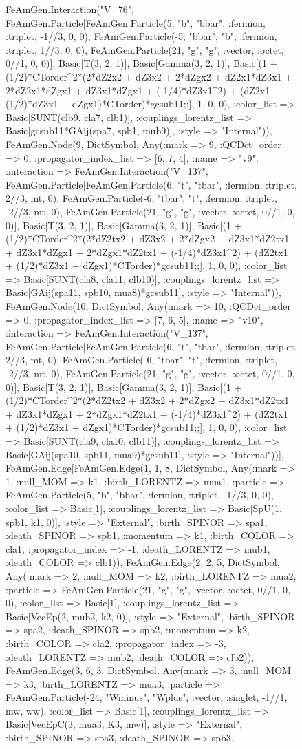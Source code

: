 \documentclass{revtex4}
\begin{document}
\begin{figure}[!htb]
\begin{center}
{FeAmGen.Interaction("V_76", FeAmGen.Particle[FeAmGen.Particle(5, "b", "bbar", :fermion, :triplet, -1//3, 0, 0), FeAmGen.Particle(-5, "bbar", "b", :fermion, :triplet, 1//3, 0, 0), FeAmGen.Particle(21, "g", "g", :vector, :octet, 0//1, 0, 0)], Basic[T(3, 2, 1)], Basic[Gamma(3, 2, 1)], Basic[(1 + (1/2)*CTorder^2*(2*dZ2x2 + dZ3x2 + 2*dZgx2 + dZ2x1*dZ3x1 + 2*dZ2x1*dZgx1 + dZ3x1*dZgx1 + (-1/4)*dZ3x1^2) + (dZ2x1 + (1/2)*dZ3x1 + dZgx1)*CTorder)*gcsub11;;], 1, 0, 0), :color_list => Basic[SUNT(clb9, cla7, clb1)], :couplings_lorentz_list => Basic[gcsub11*GAij(spa7, spb1, mub9)], :style => "Internal")), FeAmGen.Node(9, Dict{Symbol, Any}(:mark => 9, :QCDct_order => 0, :propagator_index_list => [6, 7, 4], :name => "v9", :interaction => FeAmGen.Interaction("V_137", FeAmGen.Particle[FeAmGen.Particle(6, "t", "tbar", :fermion, :triplet, 2//3, mt, 0), FeAmGen.Particle(-6, "tbar", "t", :fermion, :triplet, -2//3, mt, 0), FeAmGen.Particle(21, "g", "g", :vector, :octet, 0//1, 0, 0)], Basic[T(3, 2, 1)], Basic[Gamma(3, 2, 1)], Basic[(1 + (1/2)*CTorder^2*(2*dZ2tx2 + dZ3x2 + 2*dZgx2 + dZ3x1*dZ2tx1 + dZ3x1*dZgx1 + 2*dZgx1*dZ2tx1 + (-1/4)*dZ3x1^2) + (dZ2tx1 + (1/2)*dZ3x1 + dZgx1)*CTorder)*gcsub11;;], 1, 0, 0), :color_list => Basic[SUNT(cla8, cla11, clb10)], :couplings_lorentz_list => Basic[GAij(spa11, spb10, mua8)*gcsub11], :style => "Internal")), FeAmGen.Node(10, Dict{Symbol, Any}(:mark => 10, :QCDct_order => 0, :propagator_index_list => [7, 6, 5], :name => "v10", :interaction => FeAmGen.Interaction("V_137", FeAmGen.Particle[FeAmGen.Particle(6, "t", "tbar", :fermion, :triplet, 2//3, mt, 0), FeAmGen.Particle(-6, "tbar", "t", :fermion, :triplet, -2//3, mt, 0), FeAmGen.Particle(21, "g", "g", :vector, :octet, 0//1, 0, 0)], Basic[T(3, 2, 1)], Basic[Gamma(3, 2, 1)], Basic[(1 + (1/2)*CTorder^2*(2*dZ2tx2 + dZ3x2 + 2*dZgx2 + dZ3x1*dZ2tx1 + dZ3x1*dZgx1 + 2*dZgx1*dZ2tx1 + (-1/4)*dZ3x1^2) + (dZ2tx1 + (1/2)*dZ3x1 + dZgx1)*CTorder)*gcsub11;;], 1, 0, 0), :color_list => Basic[SUNT(cla9, cla10, clb11)], :couplings_lorentz_list => Basic[GAij(spa10, spb11, mua9)*gcsub11], :style => "Internal"))], FeAmGen.Edge[FeAmGen.Edge(1, 1, 8, Dict{Symbol, Any}(:mark => 1, :null_MOM => k1, :birth_LORENTZ => mua1, :particle => FeAmGen.Particle(5, "b", "bbar", :fermion, :triplet, -1//3, 0, 0), :color_list => Basic[1], :couplings_lorentz_list => Basic[SpU(1, spb1, k1, 0)], :style => "External", :birth_SPINOR => spa1, :death_SPINOR => spb1, :momentum => k1, :birth_COLOR => cla1, :propagator_index => -1, :death_LORENTZ => mub1, :death_COLOR => clb1)), FeAmGen.Edge(2, 2, 5, Dict{Symbol, Any}(:mark => 2, :null_MOM => k2, :birth_LORENTZ => mua2, :particle => FeAmGen.Particle(21, "g", "g", :vector, :octet, 0//1, 0, 0), :color_list => Basic[1], :couplings_lorentz_list => Basic[VecEp(2, mub2, k2, 0)], :style => "External", :birth_SPINOR => spa2, :death_SPINOR => spb2, :momentum => k2, :birth_COLOR => cla2, :propagator_index => -3, :death_LORENTZ => mub2, :death_COLOR => clb2)), FeAmGen.Edge(3, 6, 3, Dict{Symbol, Any}(:mark => 3, :null_MOM => k3, :birth_LORENTZ => mua3, :particle => FeAmGen.Particle(-24, "Wminus", "Wplus", :vector, :singlet, -1//1, mw, ww), :color_list => Basic[1], :couplings_lorentz_list => Basic[VecEpC(3, mua3, K3, mw)], :style => "External", :birth_SPINOR => spa3, :death_SPINOR => spb3, }
\end{center}
\end{figure}
\end{document}
